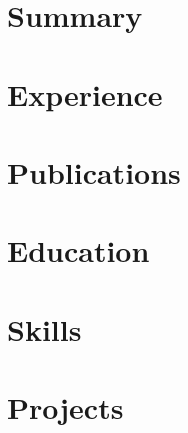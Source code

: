 \documentclass[english,a4paper,10pt,roman]{article}
\begin{document}
\thispagestyle{firstpage}

\section{Summary}


\section{Experience}


\section{Publications}


\section{Education}


\section{Skills}


\section{Projects}


\end{document}

